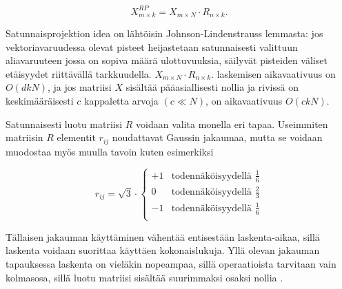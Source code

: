 \begin{equation}
X_{m \times k}^{RP} = X_{m \times N} \cdot R_{n \times k}.
\label{RP}
\end{equation}

Satunnaisprojektion idea on lähtöisin Johnson-Lindenstrauss lemmasta: jos vektoriavaruudessa olevat pisteet heijastetaan satunnaisesti valittuun aliavaruuteen jossa on sopiva määrä ulottuvuuksia, säilyvät pisteiden
väliset etäisyydet riittävällä tarkkuudella. $X_{m \times N} \cdot R_{n \times k}.$ laskemisen aikavaativuus on $O(dkN)$, ja jos matriisi $X$ sisältää pääasiallisesti nollia ja rivissä on keskimääräisesti $c$ kappaletta arvoja 
$(c \ll N)$, on aikavaativuus $O(ckN)$.

Satunnaisesti luotu matriisi $R$ voidaan valita monella eri tapaa. Useimmiten matriisin $R$ elementit $r_{ij}$ noudattavat Gaussin jakaumaa, mutta se voidaan muodostaa myös muulla tavoin kuten esimerkiksi

\begin{equation}
r_{ij} = \sqrt{3}\cdot 
\begin{cases}
 +1 &\text{todennäköisyydellä $\frac{1}{6}$} \\
 0 &\text{todennäköisyydellä $\frac{2}{3}$} \\
 -1 &\text{todennäköisyydellä $\frac{1}{6}$} \\
\end{cases}
\label{RPChoice}
\end{equation}

Tällaisen jakauman käyttäminen vähentää entisestään laskenta-aikaa, sillä laskenta voidaan suorittaa käyttäen kokonaislukuja. Yllä olevan jakauman tapauksessa laskenta on vieläkin nopeampaa, sillä operaatioista
tarvitaan vain kolmasosa, sillä luotu matriisi sisältää suurimmaksi osaksi nollia \cite{Random}.

